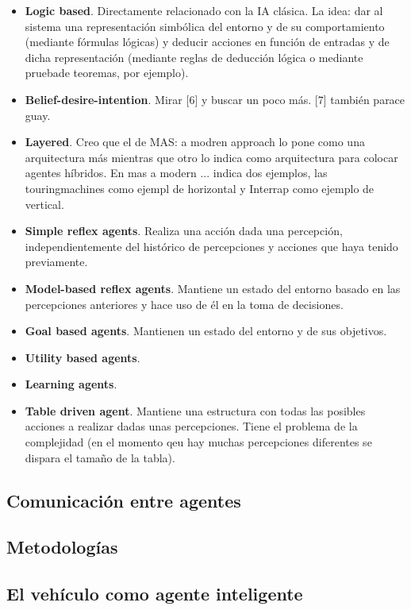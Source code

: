 \begin{itemize}
	\item \textbf{Logic based}. Directamente relacionado con la IA clásica. La idea: dar al sistema una representación simbólica del entorno y de su comportamiento (mediante fórmulas lógicas) y deducir acciones en función de entradas y de dicha representación (mediante reglas de deducción lógica o mediante pruebade teoremas, por ejemplo).
	\item \textbf{Belief-desire-intention}. Mirar [6] y buscar un poco más. [7] también parace guay.
	\item \textbf{Layered}. Creo que el de MAS: a modren approach lo pone como una arquitectura más mientras que otro lo indica como arquitectura para colocar agentes híbridos. En mas a modern ... indica dos ejemplos, las touringmachines como ejempl de horizontal y Interrap como ejemplo de vertical.
	\item \textbf{Simple reflex agents}. Realiza una acción dada una percepción, independientemente del histórico de percepciones y acciones que haya tenido previamente.
	\item \textbf{Model-based reflex agents}. Mantiene un estado del entorno basado en las percepciones anteriores y hace uso de él en la toma de decisiones.
	\item \textbf{Goal based agents}. Mantienen un estado del entorno y de sus objetivos.
	\item \textbf{Utility based agents}.
	\item \textbf{Learning agents}.
	\item \textbf{Table driven agent}. Mantiene una estructura con todas las posibles acciones a realizar dadas unas percepciones. Tiene el problema de la complejidad (en el momento qeu hay muchas percepciones diferentes se dispara el tamaño de la tabla).
\end{itemize}

\subsection{Comunicación entre agentes}

\subsection{Metodologías}

\subsection{El vehículo como agente inteligente}

